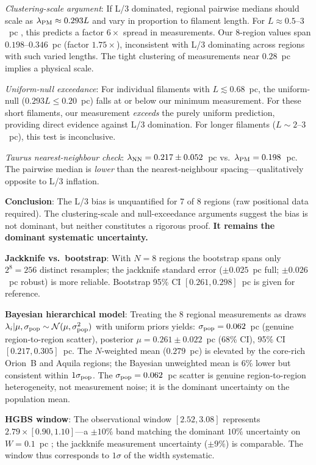 \documentclass[twoside,twocolumn]{mnras}
\begin{document}
\textit{Clustering-scale argument}: If L/3 dominated, regional pairwise medians
should scale as $\lambda_{\rm PM} \approx 0.293L$ and vary in proportion to filament
length. For $L \approx 0.5$--$3$~pc \citep{Arzoumanian2019}, this predicts a factor
$6\times$ spread in measurements. Our 8-region values span $0.198$--$0.346$~pc (factor
$1.75\times$), inconsistent with L/3 dominating across regions with such varied lengths.
The tight clustering of measurements near $0.28$~pc implies a physical scale.

\textit{Uniform-null exceedance}: For individual filaments with $L \lesssim 0.68$~pc,
the uniform-null ($0.293L \leq 0.20$~pc) falls at or below our minimum measurement.
For these short filaments, our measurement \textit{exceeds} the purely uniform
prediction, providing direct evidence against L/3 domination. For longer filaments
($L \sim 2$--$3$~pc), this test is inconclusive.

\textit{Taurus nearest-neighbour check}: $\lambda_{\rm NN} = 0.217 \pm 0.052$~pc
vs.\ $\lambda_{\rm PM} = 0.198$~pc. The pairwise median is \textit{lower} than the
nearest-neighbour spacing---qualitatively opposite to L/3 inflation.

\textbf{Conclusion}: The L/3 bias is unquantified for 7 of 8 regions (raw positional
data required). The clustering-scale and null-exceedance arguments suggest the bias is
not dominant, but neither constitutes a rigorous proof. \textbf{It remains the
dominant systematic uncertainty.}

\textbf{Jackknife vs.\ bootstrap}: With $N = 8$ regions the bootstrap spans only
$2^8 = 256$ distinct resamples; the jackknife standard error ($\pm 0.025$~pc full;
$\pm 0.026$~pc robust) is more reliable. Bootstrap 95\% CI $[0.261, 0.298]$~pc is
given for reference.

\textbf{Bayesian hierarchical model}: Treating the 8 regional measurements as draws
$\lambda_i | \mu, \sigma_{\rm pop} \sim \mathcal{N}(\mu, \sigma_{\rm pop}^2)$ with
uniform priors yields: $\sigma_{\rm pop} = 0.062$~pc (genuine region-to-region
scatter), posterior $\mu = 0.261 \pm 0.022$~pc (68\% CI), 95\% CI $[0.217, 0.305]$~pc.
The $N$-weighted mean ($0.279$~pc) is elevated by the core-rich Orion~B and Aquila
regions; the Bayesian unweighted mean is $6\%$ lower but consistent within
$1\sigma_{\rm pop}$. The $\sigma_{\rm pop} = 0.062$~pc scatter is genuine
region-to-region heterogeneity, not measurement noise; it is the dominant uncertainty
on the population mean.

\textbf{HGBS window}: The observational window $[2.52, 3.08]$ represents
$2.79 \times [0.90, 1.10]$---a $\pm 10\%$ band matching the dominant $10\%$ uncertainty
on $W = 0.1$~pc \citep{Panopoulou2022}; the jackknife measurement uncertainty ($\pm 9\%$)
is comparable. The window thus corresponds to $1\sigma$ of the width systematic.
\end{document}
